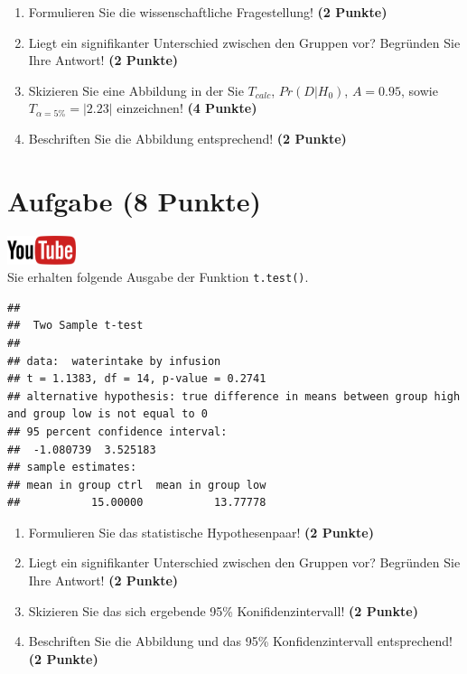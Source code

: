 \documentclass[a4paper, 10pt]{scrartcl}\usepackage[]{graphicx}\usepackage[]{xcolor}
\makeatletter
\newenvironment{kframe}{%
 \def\at@end@of@kframe{}%
 \ifinner\ifhmode%
  \def\at@end@of@kframe{\end{minipage}}%
  \begin{minipage}{\columnwidth}%
 \fi\fi%
 \def\FrameCommand##1{\hskip\@totalleftmargin \hskip-\fboxsep
 \colorbox{shadecolor}{##1}\hskip-\fboxsep
     \hskip-\linewidth \hskip-\@totalleftmargin \hskip\columnwidth}%
 \MakeFramed {\advance\hsize-\width
   \@totalleftmargin\z@ \linewidth\hsize
   \@setminipage}}%
 {\par\unskip\endMakeFramed%
 \at@end@of@kframe}
\newenvironment{knitrout}{}{} %
\makeatother
\begin{document}
\begin{enumerate}
  \item Formulieren Sie die wissenschaftliche Fragestellung! \textbf{(2
Punkte)}
\item Liegt ein signifikanter Unterschied zwischen den Gruppen vor?
  Begr{\"u}nden Sie Ihre Antwort! \textbf{(2 Punkte)}
\item Skizieren Sie eine Abbildung in der Sie $T_{calc}$, $Pr(D|H_0)$, $A=0.95$,
  sowie $T_{\alpha=5\%} = |2.23|$ einzeichnen! \textbf{(4 Punkte)}
\item Beschriften Sie die Abbildung entsprechend! \textbf{(2 Punkte)}  
\end{enumerate} 
\clearpage

\section{Aufgabe \hfill (8 Punkte)}

\hfill\href{https://youtu.be/wJqsNV1hOW8}{\includegraphics[width =
  2cm]{img/youtube}}\\[1Ex]

Sie erhalten folgende \Rlogo Ausgabe der Funktion \texttt{t.test()}.

\begin{knitrout}
\color{fgcolor}\begin{kframe}
\begin{verbatim}
## 
## 	Two Sample t-test
## 
## data:  waterintake by infusion
## t = 1.1383, df = 14, p-value = 0.2741
## alternative hypothesis: true difference in means between group high and group low is not equal to 0
## 95 percent confidence interval:
##  -1.080739  3.525183
## sample estimates:
## mean in group ctrl  mean in group low 
##           15.00000           13.77778
\end{verbatim}
\end{kframe}
\end{knitrout}


\begin{enumerate}
  \item Formulieren Sie das statistische Hypothesenpaar! \textbf{(2
Punkte)}
\item Liegt ein signifikanter Unterschied zwischen den Gruppen vor?
  Begr{\"u}nden Sie Ihre Antwort! \textbf{(2 Punkte)}
\item Skizieren Sie das sich ergebende 95\% Konifidenzintervall! \textbf{(2 Punkte)}
\item Beschriften Sie die Abbildung und
  das 95\% Konfidenzintervall entsprechend! \textbf{(2 Punkte)}  
\end{enumerate} 
\clearpage
\end{document}
